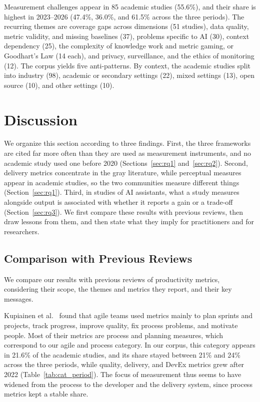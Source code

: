 \documentclass[preprint,number]{elsarticle}
\newcounter{study}
\begin{document}
\begin{tcolorbox}[colback=gray!5, colframe=gray!50, title={\textbf{Summary of RQ4}}, fonttitle=\small]
\footnotesize
Measurement challenges appear in 85 academic studies (55.6\%), and their share is highest in 2023--2026 (47.4\%, 36.0\%, and 61.5\% across the three periods). The recurring themes are coverage gaps across dimensions (51 studies), data quality, metric validity, and missing baselines (37), problems specific to AI (30), context dependency (25), the complexity of knowledge work and metric gaming, or Goodhart's Law (14 each), and privacy, surveillance, and the ethics of monitoring (12). The corpus yields five anti-patterns. By context, the academic studies split into industry (98), academic or secondary settings (22), mixed settings (13), open source (10), and other settings (10).
\end{tcolorbox}


\section{Discussion}
\label{sec:discussion}

We organize this section according to three findings. First, the three frameworks are cited far more often than they are used as measurement instruments, and no academic study used one before 2020 (Sections~\ref{sec:rq1} and~\ref{sec:rq2}). Second, delivery metrics concentrate in the gray literature, while perceptual measures appear in academic studies, so the two communities measure different things (Section~\ref{sec:rq1}). Third, in studies of AI assistants, what a study measures alongside output is associated with whether it reports a gain or a trade-off (Section~\ref{sec:rq3}). We first compare these results with previous reviews, then draw lessons from them, and then state what they imply for practitioners and for researchers.


\subsection{Comparison with Previous Reviews}

We compare our results with previous reviews of productivity metrics, considering their scope, the themes and metrics they report, and their key messages.

Kupiainen et al.~\cite{kupiainen2015metrics} found that agile teams used metrics mainly to plan sprints and projects, track progress, improve quality, fix process problems, and motivate people. Most of their metrics are process and planning measures, which correspond to our agile and process category. In our corpus, this category appears in 21.6\% of the academic studies, and its share stayed between 21\% and 24\% across the three periods, while quality, delivery, and DevEx metrics grew after 2022 (Table~\ref{tab:cat_period}). The focus of measurement thus seems to have widened from the process to the developer and the delivery system, since process metrics kept a stable share.
\end{document}
